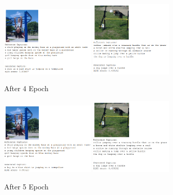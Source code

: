 \documentclass{article}
\begin{document}
    \begin{figure}[H]
        \centering
        \includegraphics[width=0.4\textwidth]{lstm_girl_epoch_4.PNG}
        \includegraphics[width=0.35\textwidth]{lstm_dog_epoch_4.PNG}
        \caption{After 4 Epoch}
    \end{figure}

    \begin{figure}[H]
        \centering
        \includegraphics[width=0.4\textwidth]{lstm_girl_epoch_5.PNG}
        \includegraphics[width=0.35\textwidth]{lstm_dog_epoch_5.PNG}
        \caption{After 5 Epoch}
    \end{figure}
\end{document}
